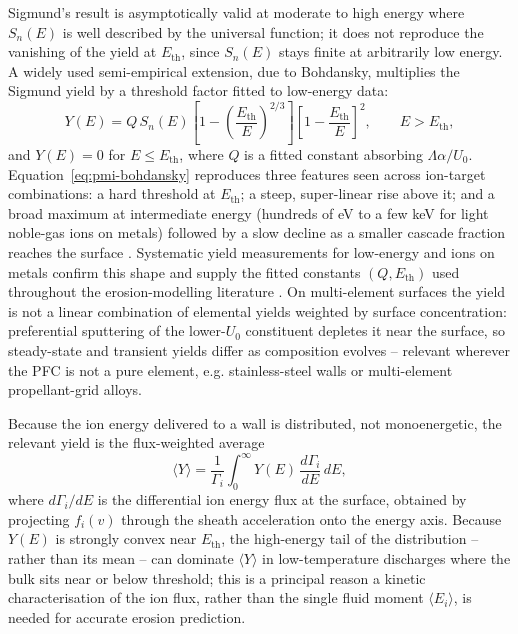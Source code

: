 Sigmund's result is asymptotically valid at moderate to high energy where $S_n(E)$ is well described by the universal function; it does not reproduce the vanishing of the yield at $E_{\mathrm{th}}$, since $S_n(E)$ stays finite at arbitrarily low energy. A widely used semi-empirical extension, due to Bohdansky, multiplies the Sigmund yield by a threshold factor fitted to low-energy data:
\begin{equation}
Y(E) = Q\, S_n(E) \left[1-\left(\frac{E_{\mathrm{th}}}{E}\right)^{2/3}\right]\left[1-\frac{E_{\mathrm{th}}}{E}\right]^{2}, \qquad E > E_{\mathrm{th}},
\label{eq:pmi-bohdansky}
\end{equation}
and $Y(E)=0$ for $E \le E_{\mathrm{th}}$, where $Q$ is a fitted constant absorbing $\Lambda\alpha/U_0$. Equation~\eqref{eq:pmi-bohdansky} reproduces three features seen across ion-target combinations: a hard threshold at $E_{\mathrm{th}}$; a steep, super-linear rise above it; and a broad maximum at intermediate energy (hundreds of eV to a few keV for light noble-gas ions on metals) followed by a slow decline as a smaller cascade fraction reaches the surface \cite{ref0144}. Systematic yield measurements for low-energy  and  ions on metals confirm this shape and supply the fitted constants $(Q, E_{\mathrm{th}})$ used throughout the erosion-modelling literature \cite{ref0152}. On multi-element surfaces the yield is not a linear combination of elemental yields weighted by surface concentration: preferential sputtering of the lower-$U_0$ constituent depletes it near the surface, so steady-state and transient yields differ as composition evolves -- relevant wherever the PFC is not a pure element, e.g. stainless-steel walls or multi-element propellant-grid alloys.

Because the ion energy delivered to a wall is distributed, not monoenergetic, the relevant yield is the flux-weighted average
\begin{equation}
\langle Y \rangle = \frac{1}{\Gamma_i}\int_0^\infty Y(E)\, \frac{d\Gamma_i}{dE}\, dE,
\label{eq:pmi-yieldaverage}
\end{equation}
where $d\Gamma_i/dE$ is the differential ion energy flux at the surface, obtained by projecting $f_i(v)$ through the sheath acceleration onto the energy axis. Because $Y(E)$ is strongly convex near $E_{\mathrm{th}}$, the high-energy tail of the distribution -- rather than its mean -- can dominate $\langle Y\rangle$ in low-temperature discharges where the bulk sits near or below threshold; this is a principal reason a kinetic characterisation of the ion flux, rather than the single fluid moment $\langle E_i\rangle$, is needed for accurate erosion prediction.

